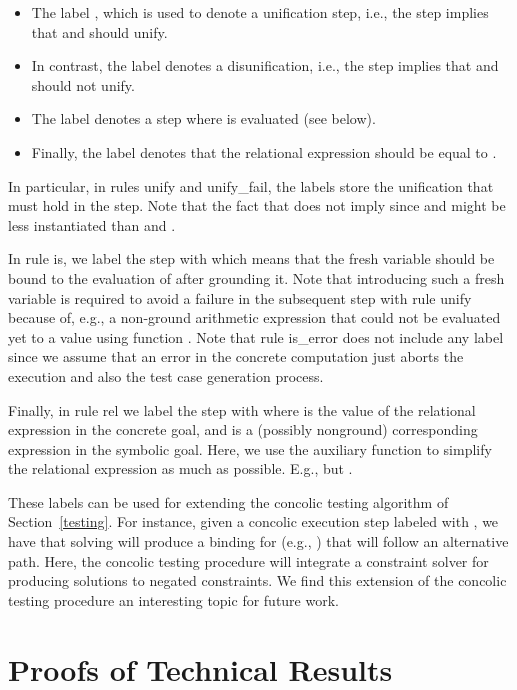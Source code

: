 \documentclass[fleqn]{tlp}
\begin{document}
\begin{appendix}
\begin{itemize}
\item The label , which is used to denote a unification
  step, i.e., the step implies that  and  should unify.

\item In contrast, the label  denotes a disunification,
  i.e., the step implies that  and  should not unify.

\item The label  denotes a step where  is
  evaluated (see below). 

\item Finally, the label  denotes that the relational
  expression  should be equal to .
\end{itemize}
In particular, in rules \textsf{unify} and \textsf{unify\_fail}, the
labels store the unification that must hold in the step. Note that the
fact that  does not imply 
since  and  might be less instantiated than  and
.

In rule \textsf{is}, we label the step with  which means
that the fresh variable  should be bound to the evaluation of
 after grounding it. Note that introducing such a fresh variable
is required to avoid a failure in the subsequent step with rule
\textsf{unify} because of, e.g., a non-ground arithmetic expression
that could not be evaluated yet to a value using function
.
Note that rule \textsf{is\_error} does not include any label since we
assume that an error in the concrete computation just aborts the
execution and also the test case generation process.

Finally, in rule \textsf{rel} we label the step with  where
 is the value  of the relational expression in the
concrete goal, and  is a (possibly nonground) corresponding
expression in the symbolic goal. Here, we use the auxiliary function
 to simplify the relational expression as much as
possible. E.g.,  but
.

These labels can be used for extending the concolic testing algorithm
of Section~\ref{testing}. For instance, given a concolic execution
step labeled with , we have that solving 
will produce a binding for  (e.g., ) that will follow an
alternative path. Here, the concolic testing procedure will integrate
a constraint solver for producing solutions to negated constraints. We
find this extension of the concolic testing procedure an interesting
topic for future work.

\section{Proofs of Technical Results} \label{appendix:proofs}


\end{appendix}
\end{document}
